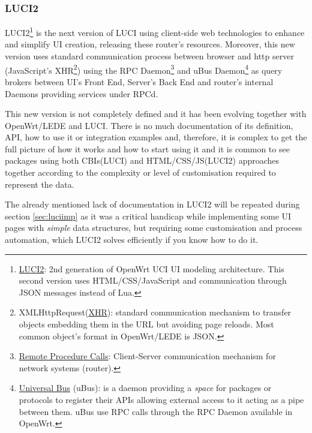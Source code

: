 \subsubsection{LUCI2}
\label{sub:sub:luci2}
LUCI2\footnote{\href{https://wiki.openwrt.org/doc/techref/luci2}{LUCI2}: 2nd generation of OpenWrt UCI UI modeling architecture. This second version uses HTML/CSS/JavaScript and communication through JSON messages instead of Lua.} is the next version of LUCI using client-side web technologies to enhance and simplify UI creation, releasing these router's resources. Moreover, this new version uses standard communication process between browser and http server (JavaScript's XHR\footnote{XMLHttpRequest(\href{https://xhr.spec.whatwg.org/}{XHR}): standard communication mechanism to transfer objects embedding them in the URL but avoiding page reloads. Most common object's format in OpenWrt/LEDE is JSON.}) using the RPC Daemon\footnote{\href{https://wiki.openwrt.org/doc/techref/rpcd}{Remote Procedure Calls}: Client-Server communication mechanism for network systems (router).} and uBus Daemon\footnote{\href{https://wiki.openwrt.org/doc/techref/ubus}{Universal Bus} (uBus): is a daemon providing a \textit{space} for packages or protocols to register their APIs allowing external access to it acting as a pipe between them. uBus use RPC calls through the RPC Daemon available in OpenWrt.} as query brokers between UI's Front End, Server's Back End and router's internal Daemons providing services under RPCd.

This new version is not completely defined and it has been evolving together with OpenWrt/LEDE and LUCI. There is no much documentation of its definition, API, how to use it or integration examples and, therefore, it is complex to get the full picture of how it works and how to start using it and it is common to see packages using both CBIs(LUCI) and HTML/CSS/JS(LUCI2) approaches together according to the complexity or level of customisation required to represent the data.

The already mentioned lack of documentation in LUCI2 will be repeated during section \ref{sec:luciimp} as it was a critical handicap while implementing some UI pages with \textit{simple} data structures, but requiring some customisation and process automation, which LUCI2 solves efficiently if you know how to do it.
